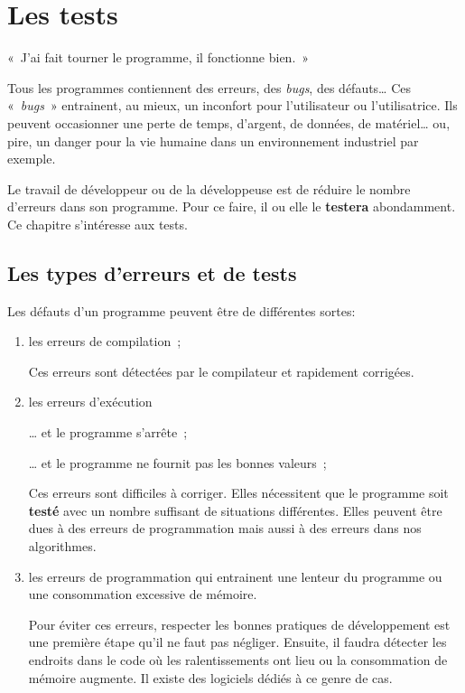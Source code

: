 \renewcommand{\chaptername}{Errata}
\chapter{Les tests}
\label{chap:tests}

\begin{Exergue}
	«~J'ai fait tourner le programme, il fonctionne bien.~»
\end{Exergue}

Tous les programmes contiennent des erreurs, des \textit{bugs}, des défauts… Ces
«~\textit{bugs}~» entrainent, au mieux, un inconfort pour l'utilisateur ou
l'utilisatrice. Ils peuvent occasionner une perte de temps, d'argent, de
données, de matériel… ou, pire, un danger pour la vie humaine dans un
environnement industriel par exemple. 

Le travail de développeur ou de la développeuse est de réduire le nombre
d'erreurs dans son programme. Pour ce faire, il ou elle le \textbf{testera}
abondamment.  Ce chapitre s'intéresse aux tests. 

\minitoc


\section{Les types d'erreurs et de tests}

Les défauts d'un programme peuvent être de différentes sortes:

\begin{enumerate}
	
	\item les erreurs de compilation~;

		Ces erreurs sont détectées par le compilateur et rapidement corrigées.

	\item les erreurs d'exécution
		
		… et le programme s'arrête~;


		… et le programme ne fournit pas les bonnes valeurs~;

		Ces erreurs sont difficiles à corriger. Elles nécessitent
		que le programme soit \textbf{testé} avec un nombre suffisant de
		situations différentes. Elles peuvent être dues à des erreurs de
		programmation mais aussi à des erreurs dans nos algorithmes. 

	\item les erreurs de programmation qui entrainent une lenteur du programme 
		ou une consommation excessive de mémoire. 

		Pour éviter ces erreurs, respecter les bonnes pratiques de développement
		est une première étape qu'il ne faut pas négliger. Ensuite, il faudra
		détecter les endroits dans le code où les ralentissements ont lieu ou la
		consommation de mémoire augmente. Il existe des logiciels dédiés à ce
		genre de cas. 

\end{enumerate}

